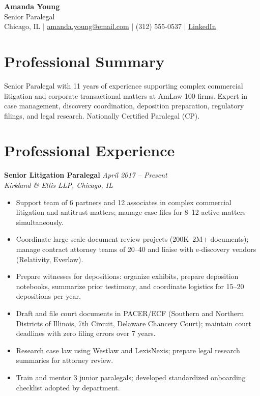 \documentclass[11pt,a4paper]{article}
\begin{document}
\begin{center}
  {\LARGE \textbf{Amanda Young}}\\[3pt]
  Senior Paralegal\\[4pt]
  Chicago, IL \quad|\quad
  \href{mailto:amanda.young@email.com}{amanda.young@email.com} \quad|\quad
  (312) 555-0537 \quad|\quad
  \href{https://linkedin.com/in/amandayoung-paralegal}{LinkedIn}
\end{center}

\section{Professional Summary}
Senior Paralegal with 11 years of experience supporting complex commercial litigation and corporate transactional matters at AmLaw 100 firms. Expert in case management, discovery coordination, deposition preparation, regulatory filings, and legal research. Nationally Certified Paralegal (CP).

\section{Professional Experience}

\noindent\textbf{Senior Litigation Paralegal} \hfill \textit{April 2017 -- Present}\\
\textit{Kirkland \& Ellis LLP, Chicago, IL}
\begin{itemize}
  \item Support team of 6 partners and 12 associates in complex commercial litigation and antitrust matters; manage case files for 8--12 active matters simultaneously.
  \item Coordinate large-scale document review projects (200K--2M+ documents); manage contract attorney teams of 20--40 and liaise with e-discovery vendors (Relativity, Everlaw).
  \item Prepare witnesses for depositions: organize exhibits, prepare deposition notebooks, summarize prior testimony, and coordinate logistics for 15--20 depositions per year.
  \item Draft and file court documents in PACER/ECF (Southern and Northern Districts of Illinois, 7th Circuit, Delaware Chancery Court); maintain court deadlines with zero filing errors over 7 years.
  \item Research case law using Westlaw and LexisNexis; prepare legal research summaries for attorney review.
  \item Train and mentor 3 junior paralegals; developed standardized onboarding checklist adopted by department.
\end{itemize}
\end{document}
